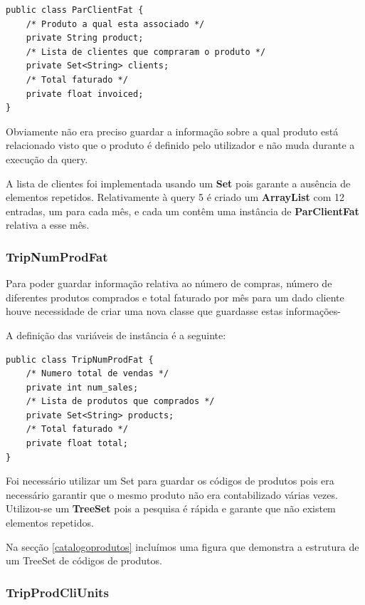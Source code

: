 \documentclass[10pt] {article}
\begin{document}
\begin{lstlisting}
public class ParClientFat {
	/* Produto a qual esta associado */
	private String product;
	/* Lista de clientes que compraram o produto */
	private Set<String> clients;
	/* Total faturado */
	private float invoiced;
}
\end{lstlisting}


Obviamente não era preciso guardar a informação sobre a qual produto está relacionado visto que o produto é definido pelo utilizador e não muda durante a execução da query.

A lista de clientes foi implementada usando um \color{blue} \textbf{Set} \color{black} pois garante a ausência de elementos 
repetidos.
Relativamente à query 5 é criado um \color{blue} \textbf{ArrayList} \color{black} com 12 entradas, um para cada mês, e cada 
um contêm uma instância de \color{blue} \textbf{ParClientFat} \color{black} relativa a esse mês.

\subsubsection{TripNumProdFat}

Para poder guardar informação relativa ao número de compras, número de diferentes produtos comprados e total faturado por mês para um dado cliente houve necessidade de criar uma nova classe que guardasse estas informações-

A definição das variáveis de instância é a seguinte:

\begin{lstlisting}
public class TripNumProdFat {
	/* Numero total de vendas */
	private int num_sales;
	/* Lista de produtos que comprados */
	private Set<String> products;
	/* Total faturado */
	private float total;
}
\end{lstlisting}


Foi necessário utilizar um Set para guardar os códigos de produtos pois era necessário garantir que o mesmo produto não era 
contabilizado várias vezes.
Utilizou-se um \color{blue} \textbf{TreeSet} \color{black} pois a pesquisa é rápida e garante que não existem elementos 
repetidos.

Na secção \ref{catalogoprodutos} incluímos uma figura que demonstra a estrutura de um TreeSet de códigos de produtos.

\subsubsection{TripProdCliUnits}
\end{document}
